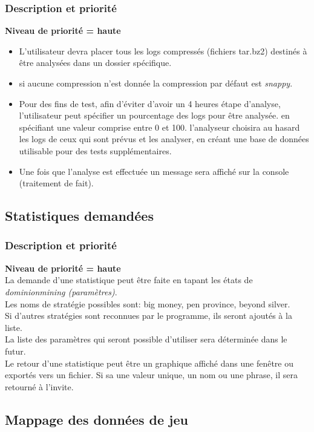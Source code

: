 \subsubsection{Description et priorité}
\textbf{Niveau de priorité = haute}\\
\begin{itemize}
  \item L'utilisateur devra placer tous les logs compressés (fichiers tar.bz2) destinés à  être analysées dans un dossier spécifique.
  \item si aucune compression n'est donnée la compression par défaut est \textit{snappy}.
    \item Pour des fins de test, afin d'éviter d'avoir un 4 heures étape d'analyse, l'utilisateur peut spécifier un pourcentage des logs pour être analysée. en spécifiant une valeur comprise entre 0 et 100. l'analyseur choisira au hasard les logs de ceux qui sont prévus et les analyser, en créant une base de données utilisable pour des tests supplémentaires.
    \item Une fois que l'analyse est effectuée un message sera affiché sur la console (traitement de fait).

\end{itemize}

\subsection{Statistiques demandées}
\subsubsection{Description et priorité}
\textbf{Niveau de priorité = haute}\\
La demande d'une statistique peut être faite en tapant les états de \textit{dominionmining (paramètres)}.  \\
Les noms de stratégie possibles sont: big money, pen province, beyond silver.\\
Si d'autres stratégies sont reconnues par le programme, ils seront ajoutés à la liste.\\
La liste des paramètres qui seront possible d'utiliser sera déterminée dans le futur.\\

Le retour d'une statistique peut être un graphique affiché dans une fenêtre ou exportés vers un fichier. Si sa une valeur unique, un nom ou une phrase, il sera retourné à l'invite.

\subsection{Mappage des données de jeu}

